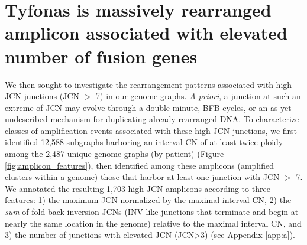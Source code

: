 \documentclass[phd,tocprelim]{cornell}
\renewcommand{\caption}[1]{\singlespacing\hangcaption{#1}\normalspacing}
\begin{document}
\section{Tyfonas is massively rearranged amplicon associated with elevated number of fusion genes}
We then sought to investigate the rearrangement patterns associated with high-JCN junctions (JCN $>$ 7) in our genome graphs.  \textit{A priori}, a junction at such an extreme of JCN may evolve through a double minute, BFB cycles, or an as yet undescribed mechanism for duplicating already rearranged DNA. To characterize classes of  amplification events associated with these high-JCN junctions, we first identified 12,588 subgraphs harboring an interval CN of at least twice ploidy among the 2,487 unique genome graphs (by patient) (Figure \ref{fig:amplicon_features}), then identified among these amplicons (amplified clusters within a genome) those that harbor at least one junction with JCN $>$ 7.  We annotated the resulting 1,703 high-JCN amplicons according to three features: 1) the maximum JCN normalized by the maximal interval CN, 2) the \textit{sum} of fold back inversion JCNs (INV-like junctions that terminate and begin at nearly the same location in the genome) relative to the maximal interval CN, and 3) the number of junctions with elevated JCN (JCN>3) (see Appendix \ref{app:a}).

\clearpage
\begin{figure}[!ht]
\end{figure}
\end{document}
